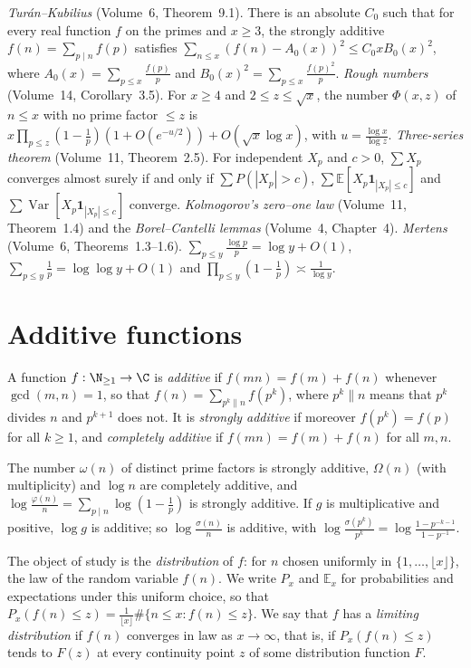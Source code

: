 \begin{reminder}
\emph{Tur\'an--Kubilius} (Volume~6, Theorem~9.1). There is an absolute $C_0$ such that for every real function $f$ on the primes and $x\ge3$, the strongly additive $f(n)=\sum_{p\mid n}f(p)$ satisfies $\sum_{n\le x}(f(n)-A_0(x))^2\le C_0xB_0(x)^2$, where $A_0(x)=\sum_{p\le x}\frac{f(p)}p$ and $B_0(x)^2=\sum_{p\le x}\frac{f(p)^2}p$.
\emph{Rough numbers} (Volume~14, Corollary~3.5). For $x\ge4$ and $2\le z\le\sqrt x$, the number $\Phi(x,z)$ of $n\le x$ with no prime factor $\le z$ is $x\prod_{p\le z}(1-\frac1p)(1+O(e^{-u/2}))+O(\sqrt x\log x)$, with $u=\frac{\log x}{\log z}$.
\emph{Three-series theorem} (Volume~11, Theorem~2.5). For independent $X_p$ and $c>0$, $\sum X_p$ converges almost surely if and only if $\sum P(|X_p|>c)$, $\sum\mathbb E[X_p\mathbf 1_{|X_p|\le c}]$ and $\sum\operatorname{Var}[X_p\mathbf 1_{|X_p|\le c}]$ converge.
\emph{Kolmogorov's zero--one law} (Volume~11, Theorem~1.4) and the \emph{Borel--Cantelli lemmas} (Volume~4, Chapter~4).
\emph{Mertens} (Volume~6, Theorems~1.3--1.6). $\sum_{p\le y}\frac{\log p}p=\log y+O(1)$, $\sum_{p\le y}\frac1p=\log\log y+O(1)$ and $\prod_{p\le y}(1-\frac1p)\asymp\frac1{\log y}$.
\end{reminder}

\section{Additive functions}

\begin{definition}\label{def:additive}
A function $f:\N_{\ge1}\to\C$ is \emph{additive} if $f(mn)=f(m)+f(n)$ whenever $\gcd(m,n)=1$, so that $f(n)=\sum_{p^k\parallel n}f(p^k)$, where $p^k\parallel n$ means that $p^k$ divides $n$ and $p^{k+1}$ does not. It is \emph{strongly additive} if moreover $f(p^k)=f(p)$ for all $k\ge1$, and \emph{completely additive} if $f(mn)=f(m)+f(n)$ for all $m,n$.
\end{definition}

The number $\omega(n)$ of distinct prime factors is strongly additive, $\Omega(n)$ (with multiplicity) and $\log n$ are completely additive, and $\log\frac{\varphi(n)}n=\sum_{p\mid n}\log(1-\frac1p)$ is strongly additive. If $g$ is multiplicative and positive, $\log g$ is additive; so $\log\frac{\sigma(n)}n$ is additive, with $\log\frac{\sigma(p^k)}{p^k}=\log\frac{1-p^{-k-1}}{1-p^{-1}}$.

The object of study is the \emph{distribution} of $f$: for $n$ chosen uniformly in $\{1,\dots,\lfloor x\rfloor\}$, the law of the random variable $f(n)$. We write $P_x$ and $\mathbb E_x$ for probabilities and expectations under this uniform choice, so that $P_x(f(n)\le z)=\frac1{\lfloor x\rfloor}\#\{n\le x:f(n)\le z\}$. We say that $f$ has a \emph{limiting distribution} if $f(n)$ converges in law as $x\to\infty$, that is, if $P_x(f(n)\le z)$ tends to $F(z)$ at every continuity point $z$ of some distribution function $F$.

